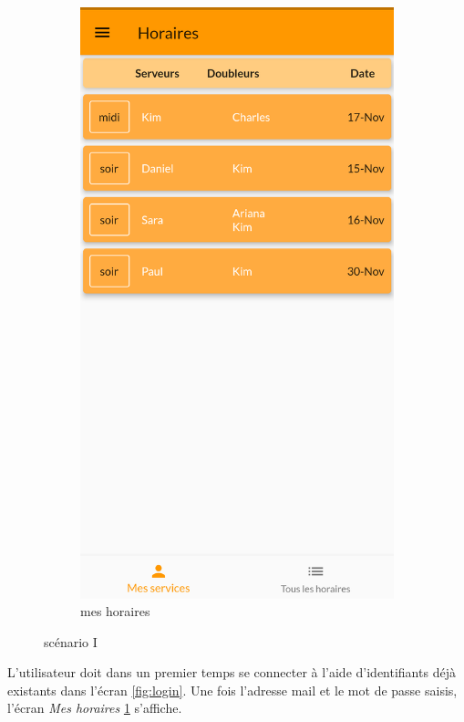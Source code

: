 \begin{figure}[!h]
\begin{subfigure}{.3\textwidth}
        \includegraphics[width=0.9\linewidth]{screenshots/scenario_01/mesHoraires.png}
        \caption{mes horaires}
        \label{fig:mesHoraires}
    \end{subfigure}
    \caption{scénario I}
    \label{fig:scen01}
\end{figure}

L'utilisateur doit dans un premier temps se connecter à l'aide d'identifiants déjà existants dans l'écran \ref{fig:login}. Une fois l'adresse mail et le mot de passe saisis, 
l'écran \textit{Mes horaires} \ref{fig:mesHoraires} s'affiche. 


